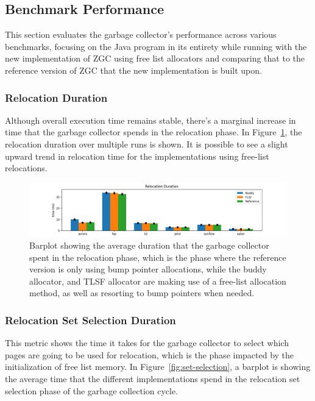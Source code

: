 \subsection{Benchmark Performance}
This section evaluates the garbage collector's performance across various benchmarks, focusing on the Java program in its entirety while running with the new implementation of ZGC using free list allocators and comparing that to the reference version of ZGC that the new implementation is built upon.


\subsubsection{Relocation Duration}

Although overall execution time remains stable, there's a marginal increase in time that the garbage collector spends in the relocation phase. In Figure~\ref{fig:relocation-duration}, the relocation duration over multiple runs is shown. It is possible to see a slight upward trend in relocation time for the implementations using free-list relocations. 

\begin{figure}[H]
\centering
\includegraphics[width=1\textwidth]{figures/relocation.png}
\caption{Barplot showing the average duration that the garbage collector spent in the relocation phase, which is the phase where the reference version is only using bump pointer allocations, while the buddy allocator, and TLSF allocator are making use of a free-list allocation method, as well as resorting to bump pointers when needed.}
\label{fig:relocation-duration}
\end{figure}

\subsubsection{Relocation Set Selection Duration}

This metric shows the time it takes for the garbage collector to select which pages are going to be used for relocation, which is the phase impacted by the initialization of free list memory. In Figure~\ref{fig:set-selection}, a barplot is showing the average time that the different implementations spend in the relocation set selection phase of the garbage collection cycle.


